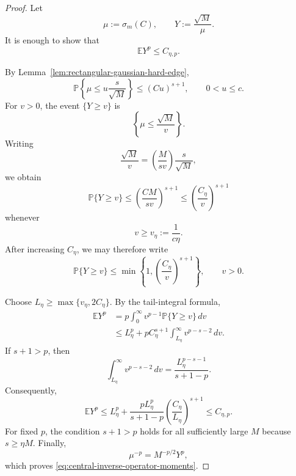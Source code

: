 \documentclass[11pt]{article}
\newcommand{\Pbb}{\mathbb P}
\newcommand{\Ebb}{\mathbb E}
\newcommand{\1}{\mathbf 1}
\begin{document}
\begin{proof}
Let
\[
        \mu:=\sigma_m(C),
        \qquad
        Y:=\frac{\sqrt M}{\mu}.
\]
It is enough to show that
\[
        \Ebb Y^p\le C_{\eta,p}.
\]

By Lemma~\ref{lem:rectangular-gaussian-hard-edge},
\[
        \Pbb\left\{
        \mu\le u\frac{s}{\sqrt M}
        \right\}
        \le
        (Cu)^{s+1},
        \qquad
        0<u\le c.
\]
For \(v>0\), the event \(\{Y\ge v\}\) is
\[
        \left\{
        \mu\le\frac{\sqrt M}{v}
        \right\}.
\]
Writing
\[
        \frac{\sqrt M}{v}
        =
        \left(\frac{M}{sv}\right)\frac{s}{\sqrt M},
\]
we obtain
\[
        \Pbb\{Y\ge v\}
        \le
        \left(\frac{CM}{sv}\right)^{s+1}
        \le
        \left(\frac{C_\eta}{v}\right)^{s+1}
\]
whenever
\[
        v\ge v_\eta:=\frac{1}{c\eta}.
\]
After increasing \(C_\eta\), we may therefore write
\begin{equation}
        \Pbb\{Y\ge v\}
        \le
        \min\left\{
        1,
        \left(\frac{C_\eta}{v}\right)^{s+1}
        \right\},
        \qquad v>0.
        \label{eq:central-inverse-tail}
\end{equation}

Choose \(L_\eta\ge\max\{v_\eta,2C_\eta\}\).  By the tail-integral formula,
\begin{align*}
        \Ebb Y^p
        &=
        p\int_0^\infty
        v^{p-1}\Pbb\{Y\ge v\}\,dv
\\
        &\le
        L_\eta^p
        +
        pC_\eta^{s+1}
        \int_{L_\eta}^\infty
        v^{p-s-2}\,dv.
\end{align*}
If \(s+1>p\), then
\[
        \int_{L_\eta}^\infty
        v^{p-s-2}\,dv
        =
        \frac{L_\eta^{p-s-1}}{s+1-p}.
\]
Consequently,
\[
        \Ebb Y^p
        \le
        L_\eta^p
        +
        \frac{pL_\eta^p}{s+1-p}
        \left(\frac{C_\eta}{L_\eta}\right)^{s+1}
        \le
        C_{\eta,p}.
\]
For fixed \(p\), the condition \(s+1>p\) holds for all sufficiently large \(M\)
because \(s\ge\eta M\).  Finally,
\[
        \mu^{-p}
        =
        M^{-p/2}Y^p,
\]
which proves \eqref{eq:central-inverse-operator-moments}.
\end{proof}
\end{document}
